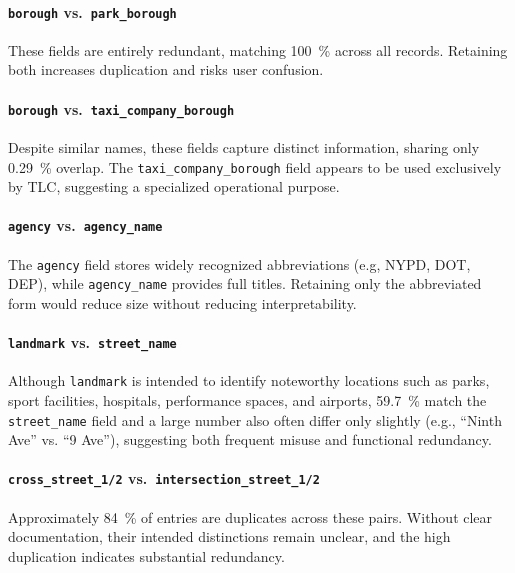 \documentclass[linenumber]{jdsart}
\begin{document}
\paragraph{\texttt{borough} vs.~\texttt{park\_borough}}
These fields are entirely redundant, matching
\SI{100}{\percent} across all records. Retaining both increases duplication and
risks user confusion.

\paragraph{\texttt{borough} vs.~\texttt{taxi\_company\_borough}}
Despite similar names, these fields capture distinct information, sharing only
\SI[round-precision = 2]{0.29}{\percent} overlap. The
\texttt{taxi\_company\_borough} field appears to be used exclusively by TLC,
suggesting a specialized operational purpose.

\paragraph{\texttt{agency} vs.~\texttt{agency\_name}}
The \texttt{agency} field stores widely recognized 
abbreviations (e.g, NYPD, DOT, DEP), while
\texttt{agency\_name} provides full titles. Retaining only the abbreviated form
would reduce size without reducing interpretability.

\paragraph{\texttt{landmark} vs.~\texttt{street\_name}}
Although \texttt{landmark} is intended to identify noteworthy locations
such as parks, sport facilities, hospitals,  performance spaces, and airports, 
 \SI{59.7}{\percent} match the \texttt{street\_name} field and a large
 number also often differ only slightly (e.g., “Ninth Ave” vs. “9 Ave”), 
 suggesting both frequent misuse and functional redundancy.

\paragraph{\texttt{cross\_street\_1/2} vs.~\texttt{intersection\_street\_1/2}}
Approximately \SI{84}{\percent} of entries are duplicates across these pairs.
Without clear documentation, their intended distinctions remain unclear, and
the high duplication indicates substantial redundancy.

\end{document}
